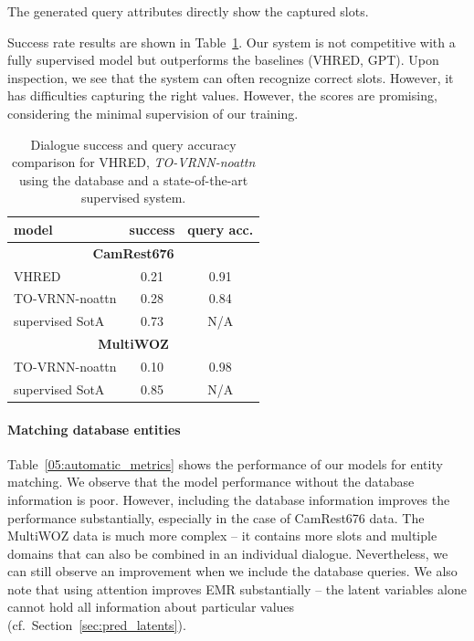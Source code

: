 The generated query attributes directly show the captured slots.


Success rate results are shown in Table~\ref{tab:success}.
Our system is not competitive with a fully supervised model but outperforms the baselines (VHRED, GPT).
Upon inspection,
we see that the system can often recognize correct slots.
However, it has difficulties capturing the right values.
However, the scores are promising, considering the minimal supervision of our training.

\begin{table}[tp]
    \centering\small
    \begin{tabular}{lcc}
      \toprule
      model &  success & query acc.\hspace{-2mm} \\
      \midrule
      \multicolumn{3}{c}{\textbf{CamRest676}} \\
      \midrule
      VHRED & 0.21 & 0.91 \\
      TO-VRNN-noattn & 0.28 & 0.84 \\\hdashline[0.5pt/2pt]
      supervised SotA \cite{peng2021soloist}\hspace{-2mm} & 0.73 & N/A \\
      \midrule
      \multicolumn{3}{c}{\textbf{MultiWOZ}} \\
      \midrule
      TO-VRNN-noattn & 0.10 & 0.98 \\\hdashline[0.5pt/2pt]
      supervised SotA \cite{peng2021soloist}\hspace{-2mm} & 0.85 & N/A \\
      \bottomrule
  \end{tabular}
  \caption{Dialogue success and query accuracy comparison for VHRED, \emph{TO-VRNN-noattn} using the database and a state-of-the-art supervised system.}
  \label{tab:success}
\end{table}

\paragraph{Matching database entities}
\label{sec:emr}
Table~\ref{05:automatic_metrics} shows the performance of our models for entity matching.
We observe that the model performance without the database information is poor.
However, including the database information improves the performance substantially, especially in the case of CamRest676 data.
The MultiWOZ data is much more complex -- it contains more slots and multiple domains that can also be combined in an individual dialogue.
Nevertheless, we can still observe an improvement when we include the database queries.
We also note that using attention improves EMR substantially -- the latent variables alone cannot hold all information about particular values (cf.~Section~\ref{sec:pred_latents}).


